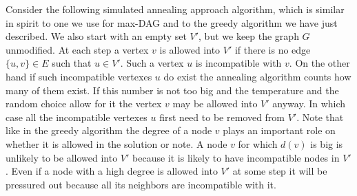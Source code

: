 \documentclass[a4paper]{article}
\begin{document}
Consider the following simulated annealing approach algorithm, which is
similar in spirit to one we use for max-DAG and to the greedy algorithm we
have just described. We also start with an empty set $V'$, but we keep the
graph $G$ unmodified. At each step a vertex $v$ is allowed into $V'$ if
there is no edge $\{u,v\} \in E$ such that $u \in V'$. Such a vertex $u$ is
incompatible with $v$. On the other hand if such incompatible vertexes $u$
do exist the annealing algorithm counts how many of them exist. If this
number is not too big and the temperature and the random choice allow for
it the vertex $v$ may be allowed into $V'$ anyway. In which case all the
incompatible vertexes $u$ first need to be removed from $V'$. Note that
like in the greedy algorithm the degree of a node $v$ plays an important
role on whether it is allowed in the solution or note. A node $v$ for which
$d(v)$ is big is unlikely to be allowed into $V'$ because it is likely to
have incompatible nodes in $V'$. Even if a node with a high degree is
allowed into $V'$ at some step it will be pressured out because all its
neighbors are incompatible with it.

%
%
\end{document}
